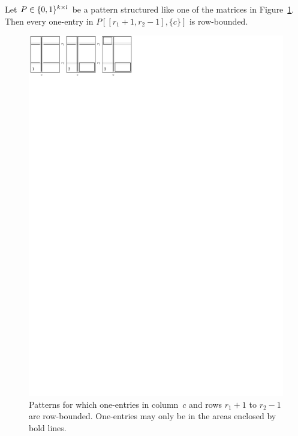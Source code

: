 \begin{lemma}
\label{lemma:I}
Let $P\in\{0,1\}^{k\times l}$ be a pattern structured like one of the matrices in Figure~\ref{fig:lemmaI}. Then every one-entry in $P[[r_1+1,r_2-1],\{c\}]$ is row-bounded.

\begin{figure}[!ht]
\centering
\includegraphics[width=120mm]{img/lemmaI.pdf}
\caption{Patterns for which one-entries in column~$c$ and rows $r_1+1$ to $r_2-1$ are row-bounded. One-entries may only be in the areas enclosed by bold lines.}
\label{fig:lemmaI}
\end{figure}
\end{lemma}

